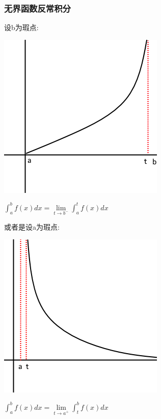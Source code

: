\documentclass[UTF8,12pt]{ctexbook}
\newcommand{\limNormal}[1]{\lim\limits_{#1}}
\newcommand{\defFunction}[1]{f(#1)}
\newcommand{\definiteIntegral}[2]{\int^{#1}_{#2}}
\begin{document}
{{{\subsubsection{无界函数反常积分}{

  设b为瑕点:

  \begin{center}
    \includegraphics[scale=0.5]{resources/infityFunctionUnormalIntegral.png}
  \end{center}

  $\definiteIntegral{b}{a}\defFunction{x}dx = \limNormal{t \to b^-}\definiteIntegral{t}{a}\defFunction{x}dx$

  或者是设a为瑕点:

  \begin{center}
    \includegraphics[scale=0.5]{resources/infityFunctionUnormalIntegral2.png}
  \end{center}

  $\definiteIntegral{b}{a}\defFunction{x}dx = \limNormal{t \to a^+}\definiteIntegral{b}{t}\defFunction{x}dx$

}}}}
\end{document}
